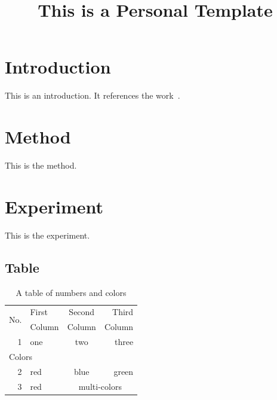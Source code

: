 \documentclass{article}
\begin{document}
\title{This is a Personal \LaTeXe{} Template}
\maketitle

\section{Introduction}
\label{sec:intr}
This is an introduction. It references the work~\cite{shannon2001mathematical}.

\section{Method}
\label{sec:method}
This is the method.

\section{Experiment}
\label{sec:exp}
This is the experiment.

\subsection{Table}
\begin{table}[h] %
  \centering     %
  \caption[table1]{A table of numbers and colors}
  \label{tab:color_num_table}

  \begin{tabular}{rlcr} %
    \toprule
    \multirow{2}{*}{No.} & First  & Second & Third  \\
                         & Column & Column & Column \\
    \midrule

    1 & one & two & three \\

    \midrule
    \multicolumn{3}{l}{Colors} \\
    \midrule

    2 & red & blue & green                     \\
    3 & red & \multicolumn{2}{c}{multi-colors} \\
    \bottomrule
  \end{tabular}
\end{table}
\end{document}
